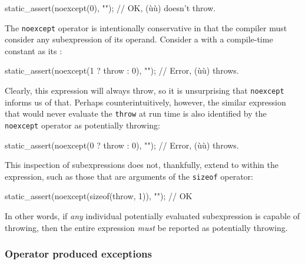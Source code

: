 \begin{emcppslisting}
static_assert(noexcept(0), "");  // OK, (ù{}ù) doesn't throw.
\end{emcppslisting}
    

\noindent The \lstinline!noexcept! operator is intentionally conservative in that the
compiler must consider any  subexpression
of its operand. Consider a  with a compile-time
constant as its :

\begin{emcppslisting}
static_assert(noexcept(1 ? throw : 0), "");  // Error, (ù{}ù) throws.
\end{emcppslisting}
    

\noindent Clearly, this expression will always throw, so it is unsurprising that
\lstinline!noexcept! informs us of that. Perhaps counterintuitively,
however, the similar expression that would never evaluate the
\lstinline!throw! at run time is also identified by the \lstinline!noexcept!
operator as potentially throwing:

\begin{emcppslisting}
static_assert(noexcept(0 ? throw : 0), "");  // Error, (ù{}ù) throws.
\end{emcppslisting}
    

\noindent This inspection of subexpressions does not, thankfully, extend to
 within the expression, such as those that
are arguments of the \lstinline!sizeof! operator:

\begin{emcppslisting}
static_assert(noexcept(sizeof(throw, 1)), "");  // OK
\end{emcppslisting}
    

\noindent In other words, if \emph{any} individual potentially evaluated
subexpression is capable of throwing, then the entire expression
\emph{must} be reported as potentially throwing.

\subsubsection[Operator produced exceptions]{Operator produced exceptions}\label{operator-produced-exceptions}

